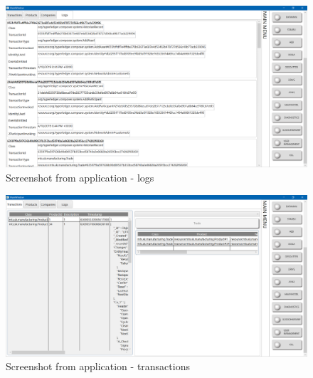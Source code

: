 \begin{figure}[H]
    \begin{center}
        \begin{minipage}{\linewidth}
            \begin{center}
                \includegraphics[width=(0.8\textwidth),keepaspectratio]{img/app/vortex_logs.png}
                \caption{Screenshot from application - logs}
                \label{obr 1.2.1}
            \end{center}
        \end{minipage}
    \end{center}
\end{figure}

\begin{figure}[H]
    \begin{center}
        \begin{minipage}{\linewidth}
            \begin{center}
                \includegraphics[width=(0.8\textwidth),keepaspectratio]{img/app/vortex_transaction.png}
                \caption{Screenshot from application - transactions}
                \label{obr 1.2.1}
            \end{center}
        \end{minipage}
    \end{center}
\end{figure}


